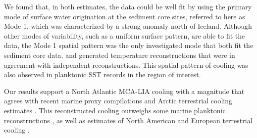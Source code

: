 \documentclass[draft]{agujournal2019}
\begin{document}
We found that, in both estimates, the data could be well fit by using the primary mode of surface water origination at the sediment core sites, referred to here as Mode 1, which was characterized by a strong anomaly north of Iceland. Although other modes of variability, such as a uniform surface pattern, are able to fit the data, the Mode 1 spatial pattern was the only investigated mode that both fit the sediment core data, and generated temperature reconstructions that were in agreement with independent reconstructions. This spatial pattern of cooling was also observed in planktonic SST records in the region of interest. 

Our results support a North Atlantic MCA-LIA cooling with a magnitude that agrees with recent marine proxy compilations \cite{ocean2k} and Arctic terrestrial cooling estimates \cite{Consortium--2013:Continental}. This reconstructed cooling outweighs some marine planktonic reconstructions \cite[]{Cunningham-Austin-2013:Reconstruction}, as well as estimates of North American and European terrestrial cooling \cite{Consortium--2013:Continental}. 

%


%
%
%
%
\end{document}
